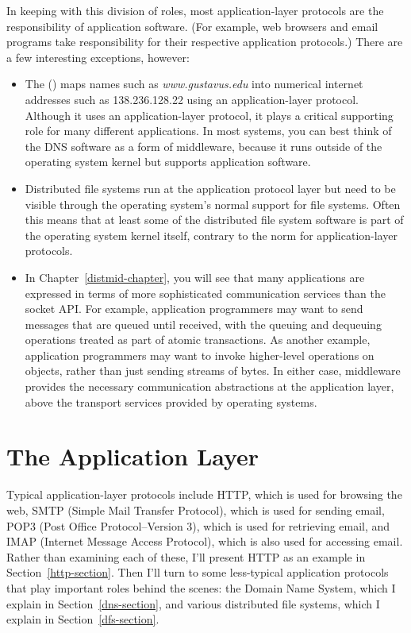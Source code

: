 In keeping with this division of roles, most application-layer protocols are the
responsibility of application software.  (For example, web browsers and
email programs take responsibility for their respective application
protocols.)  There are a few interesting exceptions, however:
\begin{itemize}
\item
The  () maps names such
as \textit{www.gustavus.edu} into numerical internet addresses such as
138.236.128.22 using an application-layer protocol.  Although
it uses an application-layer protocol, it
plays a critical supporting role for many different applications.  In
most systems, you can best think of the DNS software as a form
of middleware, because it runs outside of the operating system kernel
but supports application software.
\item
Distributed file systems run at the application protocol layer but
need to be visible through the operating system's normal support for
file systems.  Often this means that at least some of the distributed
file system
software is part of the operating system kernel itself, contrary to
the norm for application-layer protocols.
\item
In Chapter~\ref{distmid-chapter}, you will see that many applications are expressed
in terms of more sophisticated communication services than the socket
API.  For example, application programmers may want to send messages that are
queued until received, with the queuing and dequeuing operations
treated as part of atomic transactions.  As another example, application programmers may want to
invoke higher-level operations on objects, rather than just sending
streams of bytes.  In either case, middleware provides the necessary
communication abstractions at the application layer, above the
transport services provided by operating systems.
\end{itemize}

\section{The Application Layer}\label{application-layer-section}

Typical application-layer protocols include HTTP, which is used for
browsing the web, SMTP (Simple Mail Transfer Protocol), which is used
for sending email, POP3 (Post Office Protocol--Version 3), which
is used for retrieving email, and IMAP (Internet Message Access Protocol), which is also used for
accessing email.  Rather than examining each of these, I'll present
HTTP as an example in Section~\ref{http-section}.  Then I'll turn to
some less-typical application protocols that play important roles
behind the scenes: the Domain Name System, which I explain in
Section~\ref{dns-section}, and various distributed file systems, which
I explain in Section~\ref{dfs-section}.

